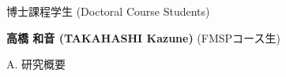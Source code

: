 %
%

博士課程学生 (Doctoral Course Students)



{\bf 高橋 和音 (TAKAHASHI Kazune)}
\hspace{5cm}(FMSPコース生)

%
%
%
%


\vspace{0.2cm}
\noindent
A. 研究概要

\vspace{0.1cm}




